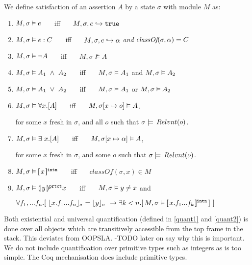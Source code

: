 \begin{definition} 
\label{def:chainmail-semantics}
We define satisfaction of an assertion $A$ by a %
state $\sigma$ with 
 module $M$ as:
\begin{enumerate}
\item
\label{cExpr}
$M , \sigma \vDash e$ \ \ \ iff \ \ \  $M, \sigma, e \hookrightarrow \texttt{true}$
\item
\label{cClass}
$M , \sigma \vDash e : C$ \ \ \ iff \ \ \  $M, \sigma, e \hookrightarrow \alpha$ \textit{and} $\textit{classOf}(\sigma, \alpha) = C$
\item
$M , \sigma \vDash \neg A$ \ \ \ iff \ \ \  ${M},{\sigma}\nvDash{A}$
\item
$\satisfiesA{M}{\sigma}{A_1\ \wedge\ A_2}$ \ \ \ iff \ \ \  $M , \sigma \vDash A_1$ and 
$M , \sigma \vDash A_2$
\item
$\satisfiesA{M}{\sigma}{A_1\ \vee\ A_2}$ \ \ \ iff \ \ \  $M , \sigma \vDash A_1$ or 
$M , \sigma \vDash A_2$
\item
\label{quant1}
$M , \sigma \vDash \forall x.[A]$ \ \ \ iff \ \ \  
$M , \sigma[x \mapsto o] \vDash A$, \\
\strut \hspace{1.3in}   for some $x$ fresh in $\sigma$, and all  $o$ such that $\sigma \models \,Relvnt(o)$.
\item
\label{quant2}
$M , \sigma \vDash \exists\ x.[A]$ \ \ \ iff \ \ \  
$M , \sigma[x \mapsto \alpha] \vDash A$, \\
\strut \hspace{1.3in}   for some $x$ fresh in $\sigma$, and some $o$ such that $\sigma \models \,Relvnt(o)$.
\item
\label{cInternal}
$M , \sigma \vDash [\!\![ \,x\, ]\!\!]^{{\texttt{intn}}}$ \ \ \ iff \ \ \  
$\textit{classOf}(\sigma,x) \in M$
\item
\label{cProtected}
$M , \sigma \vDash \llparenthesis \, y\, \rrparenthesis^{{\texttt{prtct}}} x$  \ \ \ iff \ \ \   $M , \sigma \vDash y \neq x$  and \\
\strut \hspace{1.3in} $\forall f_1,...f_n.[\ \interpret{\sigma}{x.f_1...f_n}=\interpret{\sigma}{y} \ \rightarrow \exists k<n. 
[\,\satisfiesA{M}{\sigma}{\internal{x.f_1...f_k}} \, ] \ ]$
\end{enumerate}
\end{definition}

Both existential and universal quantification (defined in \ref{quant1} and \ref{quant2}) is done over all objects which are transitively 
accessible from the top frame in the stack. This deviates from OOPSLA. -TODO later on say why this is important.
We do not include quantification over primitive types such as integers as \LangOO is too simple. The 
Coq mechanisation does include primitive types.
 
